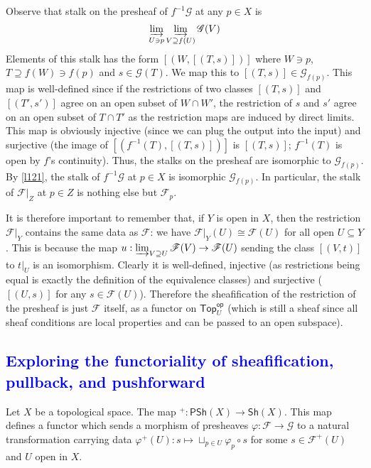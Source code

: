 \documentclass[12pt,letter]{article}
\newcommand{\Top}[0]{\mathsf{Top}}
\newcommand{\op}[0]{\mathsf{op}}
\begin{document}
	Observe that stalk on the presheaf of $f^{-1}\mathscr G$ at any $p\in X$ is
	\[\varinjlim_{U\ni p}\varinjlim_{V\supseteq f(U)}\mathscr G(V)\]
	Elements of this stalk has the form $[(W, [(T, s)])]$ where $W\ni p$, $T\supseteq f(W)\ni f(p)$ and $s\in \mathscr G(T)$. We map this to $[(T, s)]\in\mathscr G_{f(p)}$. This map is well-defined since if the restrictions of two classes $[(T, s)]$ and $[(T', s')]$ agree on an open subset of $W\cap W'$, the restriction of $s$ and $s'$ agree on an open subset of $T\cap T'$ as the restriction maps are induced by direct limits. This map is obviously injective (since we can plug the output into the input) and surjective (the image of $[(f^{-1}(T), [(T, s)])]$ is $[(T, s)]$; $f^{-1}(T)$ is open by $f$'s continuity). Thus, the stalks on the presheaf are isomorphic to $\mathscr G_{f(p)}$. By \autoref{l121}, the stalk of $f^{-1}\mathscr G$ at $p\in X$ is isomorphic $\mathscr G_{f(p)}$. In particular, the stalk of $\mathscr F|_Z$ at $p\in Z$ is nothing else but $\mathscr F_p$.
	
	It is therefore important to remember that, if $Y$ is open in $X$, then the restriction $\mathscr F|_Y$ contains the same data as $\mathscr F$: we have $\mathscr F|_Y(U)\cong \mathscr F(U)$ for all open $U\subseteq Y$. This is because the map $u:\varinjlim_{V\supseteq U} \mathscr F(V)\to \mathscr F(U)$ sending the class $[(V, t)]$ to $t|_U$ is an isomorphism. Clearly it is well-defined, injective (as restrictions being equal is exactly the definition of the equivalence classes) and surjective ($[(U, s)]$ for any $s\in \mathscr F(U)$). Therefore the sheafification of the restriction of the presheaf is just $\mathscr F$ itself, as a functor on $\Top_U^\op$ (which is still a sheaf since all sheaf conditions are local properties and can be passed to an open subspace).
	\textcolor{blue}{
	\subsection{Exploring the functoriality of sheafification, pullback, and pushforward}\label{ssec-functoriality}
	}
	Let $X$ be a topological space. The map ${}^+:\mathsf{PSh}(X)\to \mathsf{Sh}(X)$. This map defines a functor which sends a morphism of presheaves $\varphi:\mathscr F\to\mathscr G$ to a natural transformation carrying data $\varphi^+(U):s\mapsto \sqcup_{p\in U}\varphi_p\circ s$ for some $s\in \mathscr F^+(U)$ and $U$ open in $X$.
	
\end{document}
